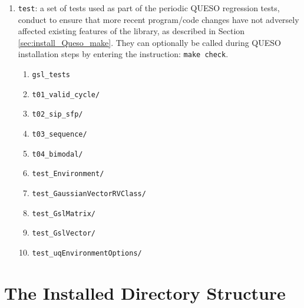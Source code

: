 \begin{enumerate}

\item  \texttt{test}: a set of tests used as part of the periodic QUESO regression tests, conduct to ensure that more recent program/code changes have not adversely affected existing features of the library, as described in Section \ref{sec:install_Queso_make}. They can optionally be called during QUESO installation steps by entering the instruction: \verb+make check+.
\begin{enumerate}
\item \texttt{gsl\_tests}
\item \texttt{t01\_valid\_cycle/}
\item \texttt{t02\_sip\_sfp/}
\item \texttt{t03\_sequence/} 
\item \texttt{t04\_bimodal/} 
\item \texttt{test\_Environment/}
\item \texttt{test\_GaussianVectorRVClass/}
\item \texttt{test\_GslMatrix/}
\item \texttt{test\_GslVector/}
\item \texttt{test\_uqEnvironmentOptions/}
\end{enumerate}

\end{enumerate}


\section{The Installed Directory Structure} \label{sc-installed-dir-structure}

